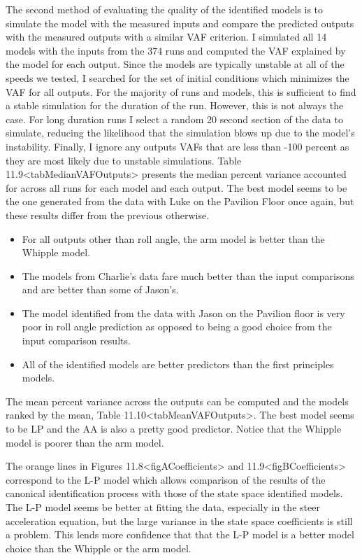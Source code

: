 \documentclass[a4paper]{article}
\begin{document}
The second method of evaluating the quality of the identified models is
to simulate the model with the measured inputs and compare the predicted
outputs with the measured outputs with a similar VAF criterion. I
simulated all 14 models with the inputs from the 374 runs and computed
the VAF explained by the model for each output. Since the models are
typically unstable at all of the speeds we tested, I searched for the
set of initial conditions which minimizes the VAF for all outputs. For
the majority of runs and models, this is sufficient to find a stable
simulation for the duration of the run. However, this is not always the
case. For long duration runs I select a random 20 second section of the
data to simulate, reducing the likelihood that the simulation blows up
due to the model's instability. Finally, I ignore any outputs VAFs that
are less than -100 percent as they are most likely due to unstable
simulations. Table 11.9\textless{}tabMedianVAFOutputs\textgreater{}
presents the median percent variance accounted for across all runs for
each model and each output. The best model seems to be the one generated
from the data with Luke on the Pavilion Floor once again, but these
results differ from the previous otherwise. %

\begin{itemize}
  \item
    For all outputs other than roll angle, the arm model is better than
    the Whipple model.
  \item
    The models from Charlie's data fare much better than the input
    comparisons and are better than some of Jason's.
  \item
    The model identified from the data with Jason on the Pavilion floor is
    very poor in roll angle prediction as opposed to being a good choice
    from the input comparison results.
  \item
    All of the identified models are better predictors than the first
    principles models.
\end{itemize}

The mean percent variance across the outputs can be computed and the
models ranked by the mean,
Table 11.10\textless{}tabMeanVAFOutputs\textgreater{}. The best model
seems to be LP and the AA is also a pretty good predictor. Notice that
the Whipple model is poorer than the arm model.

The orange lines in Figures
11.8\textless{}figACoefficients\textgreater{} and
11.9\textless{}figBCoefficients\textgreater{} correspond to the L-P
model which allows comparison of the results of the canonical
identification process with those of the state space identified models.
The L-P model seems be better at fitting the data, especially in the
steer acceleration equation, but the large variance in the state space
coefficients is still a problem. This lends more confidence that that
the L-P model is a better model choice than the Whipple or the arm
model.
\end{document}
